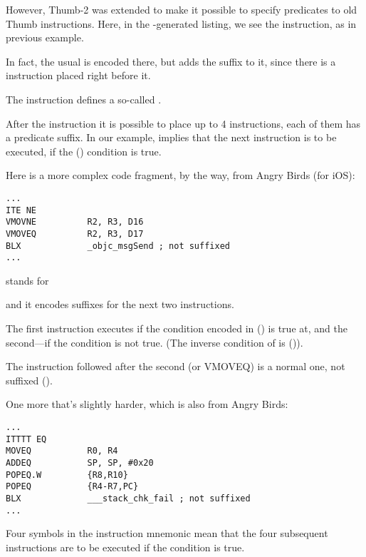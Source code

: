 
However, Thumb-2 was extended to make it possible to specify predicates to old Thumb instructions.
Here, in the \IDA-generated listing, we see the  instruction, as in previous example.

In fact, the usual  is encoded there, but \IDA adds the  suffix to it, 
since there is a  instruction placed right before it.

\label{ARM_Thumb_IT}
The  instruction defines a so-called . 

After the instruction it is possible to place up to 4 instructions, 
each of them has a predicate suffix.
In our example,  implies that the next instruction is to be executed, if the  () condition is true.

Here is a more complex code fragment, by the way, from Angry Birds (for iOS):

\begin{lstlisting}[caption=Angry Birds Classic]
...
ITE NE
VMOVNE          R2, R3, D16
VMOVEQ          R2, R3, D17
BLX             _objc_msgSend ; not suffixed
...
\end{lstlisting}

 stands for  

and it encodes suffixes for the next two instructions.

The first instruction executes if the condition encoded in  () is true at, and the second---if the condition is not true.
(The inverse condition of  is  ()).

The instruction followed after the second  (or VMOVEQ) is a normal one, not suffixed ().

One more that's slightly harder, which is also from Angry Birds:

\begin{lstlisting}[caption=Angry Birds Classic]
...
ITTTT EQ
MOVEQ           R0, R4
ADDEQ           SP, SP, #0x20
POPEQ.W         {R8,R10}
POPEQ           {R4-R7,PC}
BLX             ___stack_chk_fail ; not suffixed
...
\end{lstlisting}

Four  symbols in the instruction mnemonic mean that the four subsequent instructions are to be executed if the condition is true.

